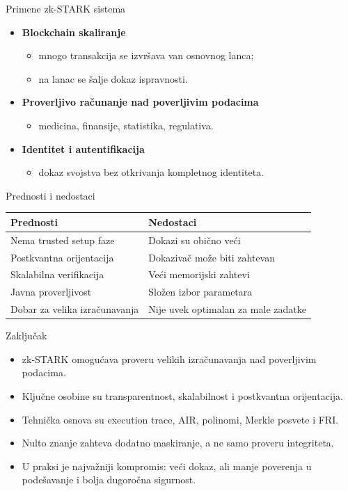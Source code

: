 \documentclass[aspectratio=1610]{beamer}
\begin{document}
	\begin{frame}{Primene zk-STARK sistema}
		\begin{itemize}
			\item \textbf{Blockchain skaliranje}
			\begin{itemize}
				\item mnogo transakcija se izvršava van osnovnog lanca;
				\item na lanac se šalje dokaz ispravnosti.
			\end{itemize}
			\item \textbf{Proverljivo računanje nad poverljivim podacima}
			\begin{itemize}
				\item medicina, finansije, statistika, regulativa.
			\end{itemize}
			\item \textbf{Identitet i autentifikacija}
			\begin{itemize}
				\item dokaz svojstva bez otkrivanja kompletnog identiteta.
			\end{itemize}
		\end{itemize}
	\end{frame}
	
	\begin{frame}{Prednosti i nedostaci}
		\begin{center}
			\small
			\begin{tabular}{|p{0.43\textwidth}|p{}|}
				\hline
				\textbf{Prednosti} & \textbf{Nedostaci} \\
				\hline
				Nema trusted setup faze & Dokazi su obično veći \\
				\hline
				Postkvantna orijentacija & Dokazivač može biti zahtevan \\
				\hline
				Skalabilna verifikacija & Veći memorijski zahtevi \\
				\hline
				Javna proverljivost & Složen izbor parametara \\
				\hline
				Dobar za velika izračunavanja & Nije uvek optimalan za male zadatke \\
				\hline
			\end{tabular}
		\end{center}
	\end{frame}
	
	\begin{frame}{Zaključak}
		\begin{itemize}
			\item zk-STARK omogućava proveru velikih izračunavanja nad poverljivim podacima.
			\item Ključne osobine su transparentnost, skalabilnost i postkvantna orijentacija.
			\item Tehnička osnova su execution trace, AIR, polinomi, Merkle posvete i FRI.
			\item Nulto znanje zahteva dodatno maskiranje, a ne samo proveru integriteta.
			\item U praksi je najvažniji kompromis: veći dokaz, ali manje poverenja u podešavanje i bolja dugoročna sigurnost.
		\end{itemize}
	\end{frame}
	
\end{document}
